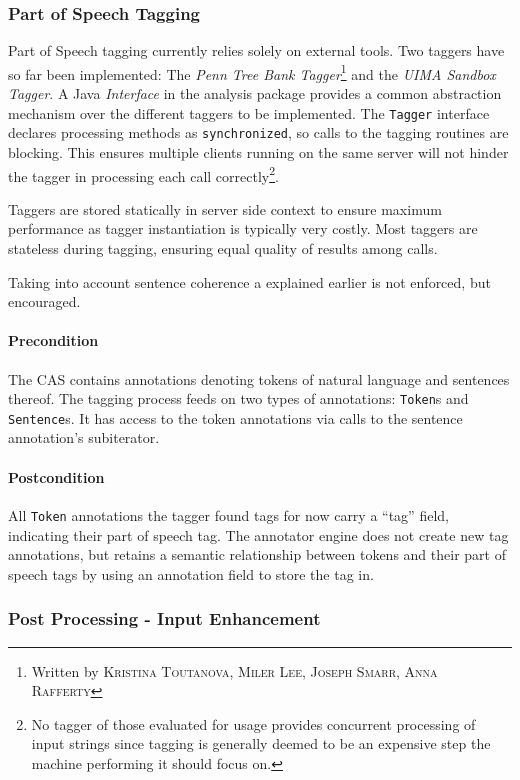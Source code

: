 \documentclass[12pt]{scrartcl}
\begin{document}
\subsubsection{Part of Speech Tagging}

Part of Speech tagging currently relies solely on external tools. Two taggers
have so far been implemented: The \emph{Penn Tree Bank Tagger}\footnote{Written
by \textsc{Kristina Toutanova}, \textsc{Miler Lee}, \textsc{Joseph Smarr},
\textsc{Anna Rafferty}} and the
\emph{UIMA Sandbox Tagger}. A Java \emph{Interface} in the analysis package
provides a common abstraction mechanism over the different taggers to be
implemented. The \verb#Tagger# interface declares processing methods as
\verb#synchronized#, so calls to the tagging routines are blocking. This ensures
multiple clients running on the same server will not hinder the tagger in
processing each call correctly\footnote{No tagger of those evaluated for usage
provides concurrent processing of input strings since tagging is generally
deemed to be an expensive step the machine performing it should focus on.}.

Taggers are stored statically in server side context to ensure maximum
performance as tagger instantiation is typically very costly. Most taggers
are stateless during tagging, ensuring equal quality of results among calls.

Taking into account sentence coherence a explained earlier is not enforced, but
encouraged.

\paragraph{Precondition} The CAS contains annotations denoting tokens of natural
language and sentences thereof. The tagging process feeds on two types of annotations:
\verb'Token's and \verb'Sentence's. It has access to the token annotations via
calls to the sentence annotation's subiterator.

\paragraph{Postcondition} All \verb'Token' annotations the tagger found tags for
now carry a ``tag'' field, indicating their part of speech tag. The annotator
engine does not create new tag annotations, but retains a semantic relationship
between tokens and their part of speech tags by using an annotation field to
store the tag in.

\subsubsection{Post Processing - Input Enhancement}
\end{document}
